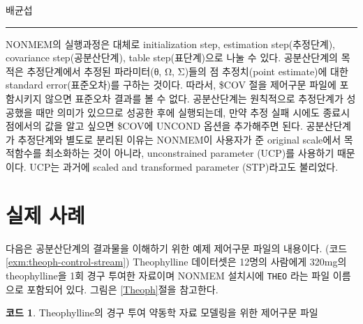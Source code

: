 \documentclass[
  10pt,
  krantz2,
  a4paper]{krantz}
\theoremstyle{definition}
\theoremstyle{definition}
\newtheorem{example}{코드}[chapter]
\theoremstyle{definition}
\theoremstyle{remark}
\begin{document}
배균섭

\begin{center}\rule{0.5\linewidth}{0.5pt}\end{center}

NONMEM의 실행과정은 대체로 initialization step, estimation step(추정단계), covariance step(공분산단계), table step(표단계)으로 나눌 수 있다. 공분산단계의 목적은 추정단계에서 추정된 파라미터(θ, Ω, Σ)들의 점 추정치(point estimate)에 대한 standard error(표준오차)를 구하는 것이다. 따라서, \$COV 절을 제어구문 파일에 포함시키지 않으면 표준오차 결과를 볼 수 없다. 공분산단계는 원칙적으로 추정단계가 성공했을 때만 의미가 있으므로 성공한 후에 실행되는데, 만약 추정 실패 시에도 종료시점에서의 값을 알고 싶으면 \$COV에 UNCOND 옵션을 추가해주면 된다. 공분산단계가 추정단계와 별도로 분리된 이유는 NONMEM이 사용자가 준 original scale에서 목적함수를 최소화하는 것이 아니라, unconstrained parameter (UCP)를 사용하기 때문이다. UCP는 과거에 scaled and transformed parameter (STP)라고도 불리었다.

\hypertarget{actual-example}{%
\section{실제 사례}\label{actual-example}}

다음은 공분산단계의 결과물을 이해하기 위한 예제 제어구문 파일의 내용이다. (코드 \ref{exm:theoph-control-stream}) Theophylline 데이터셋은 12명의 사람에게 320mg의 theophylline을 1회 경구 투여한 자료이며 NONMEM 설치시에 \texttt{THEO} 라는 파일 이름으로 포함되어 있다. 그림은 \ref{Theoph}절을 참고한다.

\begin{example}
\protect\hypertarget{exm:theoph-control-stream}{}{\label{exm:theoph-control-stream} }Theophylline의 경구 투여 약동학 자료 모델링을 위한 제어구문 파일
\end{example}
\end{document}
